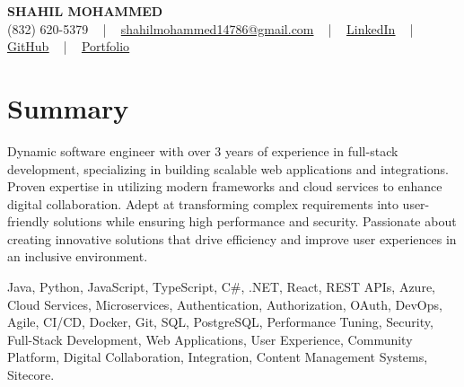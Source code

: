 \documentclass[letterpaper,10pt]{article}
\begin{document}
\begin{center}
    {\fontsize{14pt}{12pt}\selectfont \textbf{\MakeUppercase{Shahil Mohammed}}}\\ \vspace{2pt}
    \fontsize{10pt}{12pt}\selectfont (832) 620-5379 ~ | ~ \href{mailto:shahilmohammed14786@gmail.com}{shahilmohammed14786@gmail.com} ~ | ~  
    \href{https://www.linkedin.com/in/shahil-mohammed-9652931a1/}{\color{blue}\underline{LinkedIn}}  ~ | ~ 
    \href{https://github.com/freakbeast14}{\color{blue}\underline{GitHub}} ~ | ~ 
    \href{https://shahil-mohammed.netlify.app/}{\color{blue}\underline{Portfolio}}
    \vspace{-8pt}
\end{center}

\section{Summary}
\vspace{-2pt}\fontsize{8pt}{9pt}\selectfont
Dynamic software engineer with over 3 years of experience in full-stack development, specializing in building scalable web applications and integrations. Proven expertise in utilizing modern frameworks and cloud services to enhance digital collaboration. Adept at transforming complex requirements into user-friendly solutions while ensuring high performance and security. Passionate about creating innovative solutions that drive efficiency and improve user experiences in an inclusive environment. 
\vspace{-5pt}
 
{\fontsize{1pt}{1pt}\selectfont\color{white}
Java, Python, JavaScript, TypeScript, C#, .NET, React, REST APIs, Azure, Cloud Services, Microservices, Authentication, Authorization, OAuth, DevOps, Agile, CI/CD, Docker, Git, SQL, PostgreSQL, Performance Tuning, Security, Full-Stack Development, Web Applications, User Experience, Community Platform, Digital Collaboration, Integration, Content Management Systems, Sitecore.
}
\vspace{-8pt}

\vspace{-2pt}
\end{document}
